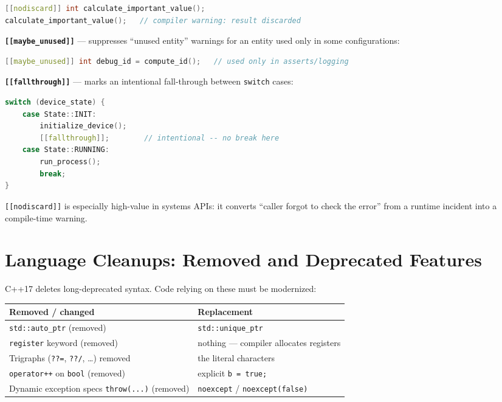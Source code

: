\begin{lstlisting}[language=C++,caption={[[nodiscard]] flags ignored results}]
[[nodiscard]] int calculate_important_value();
calculate_important_value();   // compiler warning: result discarded
\end{lstlisting}

\textbf{\texttt{[[maybe\_unused]]}} --- suppresses ``unused entity'' warnings for an entity used only in some configurations:

\begin{lstlisting}[language=C++,caption={[[maybe\_unused]] for conditionally-used entities}]
[[maybe_unused]] int debug_id = compute_id();   // used only in asserts/logging
\end{lstlisting}

\textbf{\texttt{[[fallthrough]]}} --- marks an intentional fall-through between \texttt{switch} cases:

\begin{lstlisting}[language=C++,caption={[[fallthrough]] documents intentional case fall-through}]
switch (device_state) {
    case State::INIT:
        initialize_device();
        [[fallthrough]];        // intentional -- no break here
    case State::RUNNING:
        run_process();
        break;
}
\end{lstlisting}

\texttt{[[nodiscard]]} is especially high-value in systems APIs: it converts ``caller forgot to check the error'' from a runtime incident into a compile-time warning.

\section{Language Cleanups: Removed and Deprecated Features}
\label{sec:c17-cleanups}

C++17 deletes long-deprecated syntax. Code relying on these must be modernized:

\begin{center}
\begin{tabular}{ll}
\hline
\textbf{Removed / changed} & \textbf{Replacement} \\
\hline
\texttt{std::auto\_ptr} (removed) & \texttt{std::unique\_ptr} \\
\texttt{register} keyword (removed) & nothing --- compiler allocates registers \\
Trigraphs (\texttt{??=}, \texttt{??/}, \dots) removed & the literal characters \\
\texttt{operator++} on \texttt{bool} (removed) & explicit \texttt{b = true;} \\
Dynamic exception specs \texttt{throw(...)} (removed) & \texttt{noexcept} / \texttt{noexcept(false)} \\
\hline
\end{tabular}
\end{center}

